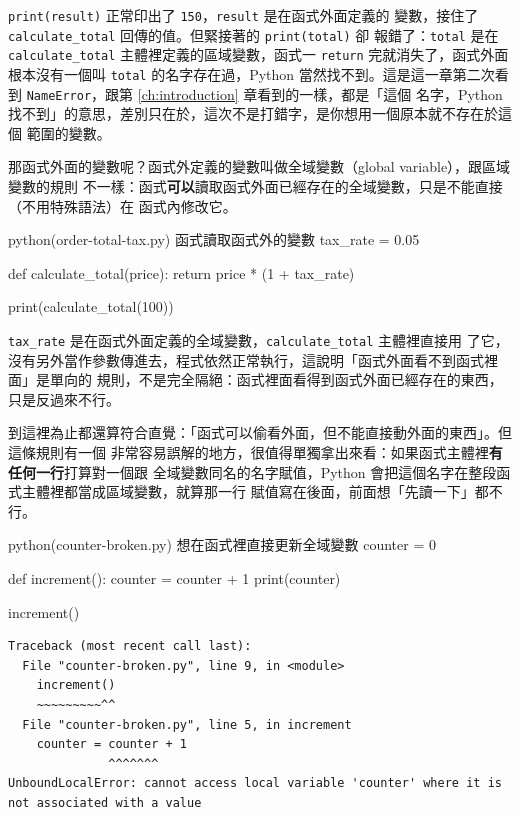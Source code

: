 \texttt{print(result)} 正常印出了 \texttt{150}，\texttt{result} 是在函式外面定義的
變數，接住了 \texttt{calculate\_total} 回傳的值。但緊接著的 \texttt{print(total)} 卻
報錯了：\texttt{total} 是在 \texttt{calculate\_total} 主體裡定義的區域變數，函式一
\texttt{return} 完就消失了，函式外面根本沒有一個叫 \texttt{total} 的名字存在過，Python
當然找不到。這是這一章第二次看到 \texttt{NameError}，跟第 \ref{ch:introduction} 章看到的一樣，都是「這個
名字，Python 找不到」的意思，差別只在於，這次不是打錯字，是你想用一個原本就不存在於這個
範圍的變數。

那函式外面的變數呢？函式外定義的變數叫做全域變數（global variable），跟區域變數的規則
不一樣：函式\textbf{可以}讀取函式外面已經存在的全域變數，只是不能直接（不用特殊語法）在
函式內修改它。

\begin{example}{python}{(order-total-tax.py) 函式讀取函式外的變數}
tax_rate = 0.05


def calculate_total(price):
    return price * (1 + tax_rate)


print(calculate_total(100))
\end{example}


\texttt{tax\_rate} 是在函式外面定義的全域變數，\texttt{calculate\_total} 主體裡直接用
了它，沒有另外當作參數傳進去，程式依然正常執行，這說明「函式外面看不到函式裡面」是單向的
規則，不是完全隔絕：函式裡面看得到函式外面已經存在的東西，只是反過來不行。

到這裡為止都還算符合直覺：「函式可以偷看外面，但不能直接動外面的東西」。但這條規則有一個
非常容易誤解的地方，很值得單獨拿出來看：如果函式主體裡\textbf{有任何一行}打算對一個跟
全域變數同名的名字賦值，Python 會把這個名字在整段函式主體裡都當成區域變數，就算那一行
賦值寫在後面，前面想「先讀一下」都不行。

\begin{example}{python}{(counter-broken.py) 想在函式裡直接更新全域變數}
counter = 0


def increment():
    counter = counter + 1
    print(counter)


increment()
\end{example}

\begin{verbatim}
Traceback (most recent call last):
  File "counter-broken.py", line 9, in <module>
    increment()
    ~~~~~~~~~^^
  File "counter-broken.py", line 5, in increment
    counter = counter + 1
              ^^^^^^^
UnboundLocalError: cannot access local variable 'counter' where it is not associated with a value
\end{verbatim}

